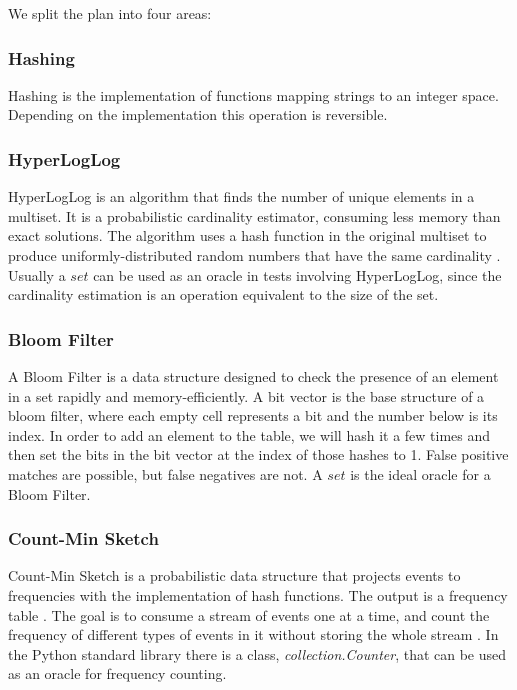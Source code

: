 \documentclass[preprint,nocopyrightspace]{sig-alternate}
\begin{document}
We split the plan into four areas:

\subsubsection{Hashing}
Hashing is the implementation of functions mapping strings to an integer space.
Depending on the implementation this operation is reversible.

\subsubsection{HyperLogLog}
HyperLogLog is an algorithm that finds the number of unique elements in a multiset.
It is a probabilistic cardinality estimator,
consuming less memory than exact solutions.
The algorithm uses a hash function in the original multiset to produce uniformly-distributed random numbers that have the same cardinality \citet{hyperloglog_2007}.
Usually a $set$ can be used as an oracle in tests involving HyperLogLog,
since the cardinality estimation is an operation equivalent to the size of the set.

\subsubsection{Bloom Filter}
A Bloom Filter is a data structure designed to check the presence of an element in a set rapidly and memory-efficiently.
A bit vector is the base structure of a bloom filter,
where each empty cell represents a bit and the number below is its index. \citet{bloom_filter}
In order to add an element to the table,
we will hash it a few times and then set the bits in the bit vector at the index of those hashes to 1.
False positive matches are possible,
but false negatives are not.
A $set$ is the ideal oracle for a Bloom Filter.

\subsubsection{Count-Min Sketch}
Count-Min Sketch is a probabilistic data structure that projects events to frequencies with the implementation of hash functions.
The output is a frequency table \citet{count_min_sketch}.
The goal is to consume a stream of events one at a time,
and count the frequency of different types of events in it without storing the whole stream \citet{count_min_sketch_2005}.
In the Python standard library there is a class,
\emph{collection.Counter},
that can be used as an oracle for frequency counting.
\end{document}
